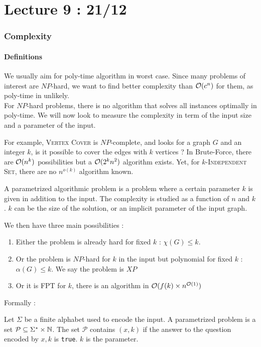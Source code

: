 \documentclass{cours}
\begin{document}
\part[Parametrized Complexity]{Lecture 9 : 21/12}
\section{Complexity}
\subsection{Definitions}
We usually aim for poly-time algorithm in worst case. Since many problems of interest are $NP$-hard, we want to find better complexity than $\mathcal{O}(c^{n})$ for them, as poly-time in unlikely. \\
For $NP$-hard problems, there is no algorithm that solves all instances optimally in poly-time. We will now look to measure the complexity in term of the input size and a parameter of the input.

For example, \textsc{Vertex Cover} is $NP$-complete, and looks for a graph $G$ and an integer $k$, is it possible to cover the edges with $k$ vertices ? In Brute-Force, there are $\mathcal{O}(n^{k})$ possibilities but a $\mathcal{O}(2^{k}n^{2})$ algorithm exists. Yet, for $k$-\textsc{Independent Set}, there are no $n^{o(k)}$ algorithm known.

\begin{definition}
    A parametrized algorithmic problem is a problem where a certain parameter $k$ is given in addition to the input. The complexity is studied as a function of $n$ and $k$. $k$ can be the size of the solution, or an implicit parameter of the input graph.
\end{definition}

We then have three main possibilities :
\begin{enumerate}
    \item Either the problem is already hard for fixed $k$ : $\chi(G) \leq k$.
    \item Or the problem is $NP$-hard for $k$ in the input but polynomial for fixed $k$ : $\alpha(G) \leq k$. We say the problem is $XP$
    \item Or it is FPT for $k$, there is an algorithm in $\mathcal{O}(f(k)\times n^{\mathcal{O}(1)})$
\end{enumerate}

Formally :
\begin{definition}
    Let $\Sigma$ be a finite alphabet used to encode the input. A parametrized problem is a set $\mathcal{P} \subseteq \Sigma^{\star} \times \mathbb{N}$. The set $\mathcal{P}$ contains $(x, k)$ if the answer to the question encoded by $x, k$ is \texttt{true}. $k$ is the parameter.
\end{definition}
\end{document}
